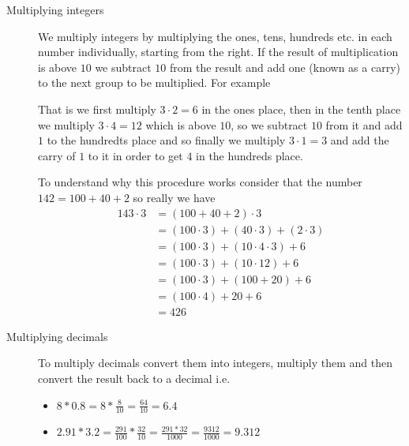 \begin{description}
\item [Multiplying integers] We multiply integers by multiplying the ones, 
tens, hundreds etc. in each number individually, starting from the right. 
If the result of multiplication is above $10$ we subtract $10$ from the 
result and add one (known as a carry) to the next group to be multiplied. 
For example
\begin{figure}[H]
\centering
{}
\end{figure}

That is we first multiply $3 \cdot 2 = 6$ in the ones place, then in the 
tenth place we multiply $3 \cdot 4 = 12$ which is above $10$, so we subtract 
$10$ from it and add $1$ to the hundredts place and so finally we multiply 
$3 \cdot 1 = 3$ and add the carry of $1$ to it in order to get $4$ in the 
hundreds place.

To understand why this procedure works consider that the number
$142 = 100 + 40 + 2$ so really we have
\[
\begin{align}
143 \cdot 3 &= (100 + 40 + 2) \cdot 3  \\
            &= (100 \cdot 3) + (40 \cdot 3) + (2 \cdot 3)  \\
            &= (100 \cdot 3) + (10 \cdot 4 \cdot 3) + 6  \\
            &= (100 \cdot 3) + (10 \cdot 12) + 6  \\
            &= (100 \cdot 3) + (100 + 20) + 6  \\
            &= (100 \cdot 4) + 20 + 6  \\
            &= 426
\end{align}
\]

\item [Multiplying decimals] To multiply decimals convert them into integers,
multiply them and then convert the result back to a decimal i.e.
\begin{itemize}
\item $8 * 0.8 = 8 * \frac{8}{10} = \frac{64}{10} = 6.4$
\item $2.91 * 3.2 = \frac{291}{100} * \frac{32}{10} = \frac{291 * 32}{1000} =
\frac{9312}{1000} = 9.312$
\end{itemize}
\end{description}

